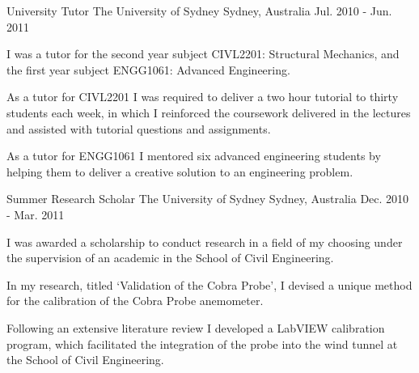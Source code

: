 \begin{cventries}
  \cventry
    {University Tutor} %
    {The University of Sydney} %
    {Sydney, Australia} %
    {Jul. 2010 - Jun. 2011} %
    {
      \begin{cvitems} %
        \item {I was a tutor for the second year subject CIVL2201: Structural Mechanics, and the first year subject ENGG1061: Advanced Engineering.}
        \item {As a tutor for CIVL2201 I was required to deliver a two hour tutorial to thirty students each week, in which I reinforced the coursework delivered in the lectures and assisted with tutorial questions and assignments.} 
        \item {As a tutor for ENGG1061 I mentored six advanced engineering students by helping them to deliver a creative solution to an engineering problem.}
      \end{cvitems}
    }

  \cventry
    {Summer Research Scholar} %
    {The University of Sydney} %
    {Sydney, Australia} %
    {Dec. 2010 - Mar. 2011} %
    {
      \begin{cvitems} %
        \item {I was awarded a scholarship to conduct research in a field of my choosing under the supervision of an academic in the School of Civil Engineering.} 
        \item {In my research, titled ‘Validation of the Cobra Probe’, I devised a unique method for the calibration of the Cobra Probe anemometer.} 
        \item {Following an extensive literature review I developed a LabVIEW calibration program, which facilitated the integration of the probe into the wind tunnel at the School of Civil Engineering.}
      \end{cvitems}
    }

\end{cventries}
